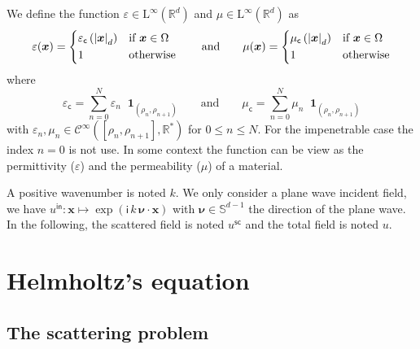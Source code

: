 \documentclass[12pt,a4paper]{article}
\theoremstyle{definition}
\theoremstyle{plain}
\theoremstyle{remark}
\newcommand{\bbR}{\mathbb{R}}
\newcommand{\bbS}{\mathbb{S}}
\newcommand{\scrC}{\mathscr{C}}
\newcommand{\rmL}{\mathrm{L}}
\newcommand{\im}{\mathsf{i}}
\newcommand{\Ind}[1]{\mathop{}\!\mathbf{1}_{#1}}
\newcommand{\plr}[1]{\left(#1\right)}
\newcommand{\abs}[1]{\left\lvert#1\right\rvert}
\newcommand{\vect}[1]{\boldsymbol{#1}}
\newcommand{\vx}{\boldsymbol{x}}
\newcommand{\eps}{\varepsilon}
\newcommand{\inc}{\mathsf{in}}
\newcommand{\sca}{\mathsf{sc}}
\newcommand{\ecav}{\varepsilon_\mathsf{c}}
\newcommand{\mcav}{\mu_\mathsf{c}}
\begin{document}
We define the function $\eps \in \rmL^\infty(\bbR^d)$ and $\mu \in \rmL^\infty(\bbR^d)$ as
\[
    \eps(\vx) = \begin{dcases}
        \ecav\plr{\abs{\vx}_d} & \text{if } \vx \in \Omega \\
        1                      & \text{otherwise}
    \end{dcases} \qquad
    \text{and} \qquad
    \mu(\vx) = \begin{dcases}
        \mcav\plr{\abs{\vx}_d} & \text{if } \vx \in \Omega \\
        1                      & \text{otherwise}
    \end{dcases}
\]
where
\[
    \ecav = \sum_{n = 0}^{N} \eps_n \Ind{(\rho_n, \rho_{n+1})} \qquad
    \text{and} \qquad
    \mcav = \sum_{n = 0}^{N} \mu_n \Ind{(\rho_n, \rho_{n+1})}
\]
with $\eps_n, \mu_n \in \scrC^\infty([\rho_n, \rho_{n+1}], \bbR^*)$ for $0 \le n \le N$.
For the impenetrable case the index $n = 0$ is not use.
In some context the function can be view as the permittivity ($\eps$) and the permeability ($\mu$) of a material.

\bigskip

A positive wavenumber is noted $k$.
We only consider a plane wave incident field, we have $u^\inc : \vx \mapsto \exp(\im\, k\, \vect{\nu} \cdot \vx)$ with $\vect{\nu} \in \bbS^{d-1}$ the direction of the plane wave.
In the following, the scattered field is noted $u^\sca$ and the total field is noted $u$.

\section{Helmholtz's equation}

\subsection{The scattering problem}
\end{document}
